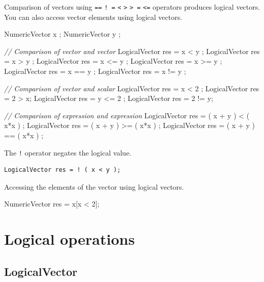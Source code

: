 \documentclass[]{book}
\newenvironment{Shaded}{\begin{snugshade}}{\end{snugshade}}
\newcommand{\DecValTok}[1]{\textcolor[rgb]{0.00,0.00,0.81}{#1}}
\newcommand{\CommentTok}[1]{\textcolor[rgb]{0.56,0.35,0.01}{\textit{#1}}}
\newcommand{\NormalTok}[1]{#1}
\theoremstyle{definition}
\theoremstyle{definition}
\theoremstyle{remark}
\begin{document}
Comparison of vectors using \texttt{==} \texttt{!\ =}
\texttt{\textless{}} \texttt{\textgreater{}} \texttt{\textgreater{}\ =}
\texttt{\textless{}=} operators produces logical vectors. You can also
access vector elements using logical vectors.

\begin{Shaded}
\begin{Highlighting}[]
\NormalTok{NumericVector x ;}
\NormalTok{NumericVector y ;}

\CommentTok{// Comparison of vector and vector}
\NormalTok{LogicalVector res = x < y ;}
\NormalTok{LogicalVector res = x > y ;}
\NormalTok{LogicalVector res = x <= y ;}
\NormalTok{LogicalVector res = x >= y ;}
\NormalTok{LogicalVector res = x == y ;}
\NormalTok{LogicalVector res = x != y ;}

\CommentTok{// Comparison of vector and scalar}
\NormalTok{LogicalVector res = x < }\DecValTok{2}\NormalTok{ ;}
\NormalTok{LogicalVector res = }\DecValTok{2}\NormalTok{ > x;}
\NormalTok{LogicalVector res = y <= }\DecValTok{2}\NormalTok{ ;}
\NormalTok{LogicalVector res = }\DecValTok{2}\NormalTok{ != y;}

\CommentTok{// Comparison of expression and expression}
\NormalTok{LogicalVector res = ( x + y ) < ( x*x ) ;}
\NormalTok{LogicalVector res = ( x + y ) >= ( x*x ) ;}
\NormalTok{LogicalVector res = ( x + y ) == ( x*x ) ;}
\end{Highlighting}
\end{Shaded}

The \texttt{!} operator negates the logical value.

\begin{verbatim}
LogicalVector res = ! ( x < y );
\end{verbatim}

Accessing the elements of the vector using logical vectors.

\begin{Shaded}
\begin{Highlighting}[]
\NormalTok{NumericVector res = x[x < }\DecValTok{2}\NormalTok{];}
\end{Highlighting}
\end{Shaded}

\chapter{Logical operations}\label{logical-operations}

\section{LogicalVector}\label{logicalvector}
\end{document}
